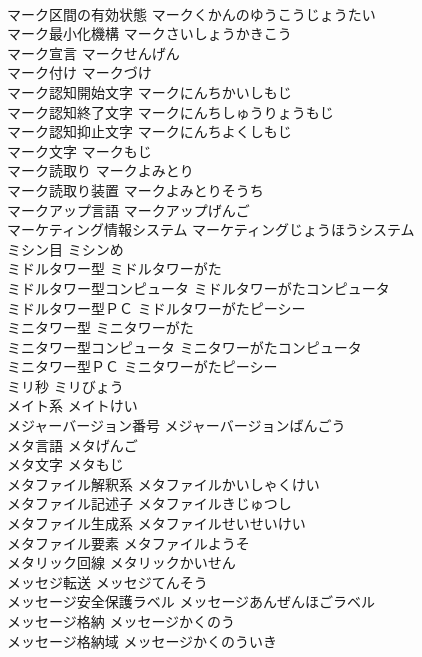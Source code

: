 \documentclass[8pt]{extreport}
\begin{document}
\begin{CJK}{UTF8}{min}
\\	マーク区間の有効状態	マークくかんのゆうこうじょうたい	
\\	マーク最小化機構	マークさいしょうかきこう	
\\	マーク宣言	マークせんげん	
\\	マーク付け	マークづけ	
\\	マーク認知開始文字	マークにんちかいしもじ	
\\	マーク認知終了文字	マークにんちしゅうりょうもじ	
\\	マーク認知抑止文字	マークにんちよくしもじ	
\\	マーク文字	マークもじ	
\\	マーク読取り	マークよみとり	
\\	マーク読取り装置	マークよみとりそうち	
\\	マークアップ言語	マークアップげんご	
\\	マーケティング情報システム	マーケティングじょうほうシステム	
\\	ミシン目	ミシンめ	
\\	ミドルタワー型	ミドルタワーがた	
\\	ミドルタワー型コンピュータ	ミドルタワーがたコンピュータ	
\\	ミドルタワー型ＰＣ	ミドルタワーがたピーシー	
\\	ミニタワー型	ミニタワーがた	
\\	ミニタワー型コンピュータ	ミニタワーがたコンピュータ	
\\	ミニタワー型ＰＣ	ミニタワーがたピーシー	
\\	ミリ秒	ミリびょう	
\\	メイト系	メイトけい	
\\	メジャーバージョン番号	メジャーバージョンばんごう	
\\	メタ言語	メタげんご	
\\	メタ文字	メタもじ	
\\	メタファイル解釈系	メタファイルかいしゃくけい	
\\	メタファイル記述子	メタファイルきじゅつし	
\\	メタファイル生成系	メタファイルせいせいけい	
\\	メタファイル要素	メタファイルようそ	
\\	メタリック回線	メタリックかいせん	
\\	メッセジ転送	メッセジてんそう	
\\	メッセージ安全保護ラベル	メッセージあんぜんほごラベル	
\\	メッセージ格納	メッセージかくのう	
\\	メッセージ格納域	メッセージかくのういき	

\end{CJK}
\end{document}
